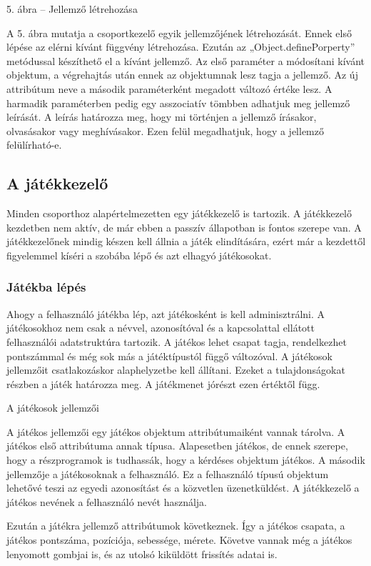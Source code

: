 \documentclass[bibliography=totocnumbered]{article}
\begin{document}
5. ábra -- Jellemző létrehozása

A 5. ábra mutatja a csoportkezelő egyik jellemzőjének létrehozását.
Ennek első lépése az elérni kívánt függvény létrehozása. Ezután az
„Object.definePorperty'' metódussal készíthető el a kívánt jellemző. Az
első paraméter a módosítani kívánt objektum, a végrehajtás után ennek az
objektumnak lesz tagja a jellemző. Az új attribútum neve a második
paraméterként megadott változó értéke lesz. A harmadik paraméterben
pedig egy asszociatív tömbben adhatjuk meg jellemző leírását. A leírás
határozza meg, hogy mi történjen a jellemző írásakor, olvasásakor vagy
meghívásakor. Ezen felül megadhatjuk, hogy a jellemző felülírható-e.


\subsection{A játékkezelő}

Minden csoporthoz alapértelmezetten egy játékkezelő is tartozik. A
játékkezelő kezdetben nem aktív, de már ebben a passzív állapotban is
fontos szerepe van. A játékkezelőnek mindig készen kell állnia a játék
elindítására, ezért már a kezdettől figyelemmel kíséri a szobába lépő és
azt elhagyó játékosokat.


\subsubsection{Játékba lépés}

Ahogy a felhasználó játékba lép, azt játékosként is kell adminisztrálni.
A játékosokhoz nem csak a névvel, azonosítóval és a kapcsolattal
ellátott felhasználói adatstruktúra tartozik. A játékos lehet csapat
tagja, rendelkezhet pontszámmal és még sok más a játéktípustól függő
változóval. A játékosok jellemzőit csatlakozáskor alaphelyzetbe kell
állítani. Ezeket a tulajdonságokat részben a játék határozza meg. A
játékmenet jórészt ezen értéktől függ.

A játékosok jellemzői

A játékos jellemzői egy játékos objektum attribútumaiként vannak
tárolva. A játékos első attribútuma annak típusa. Alapesetben játékos,
de ennek szerepe, hogy a részprogramok is tudhassák, hogy a kérdéses
objektum játékos. A második jellemzője a játékosoknak a felhasználó. Ez
a felhasználó típusú objektum lehetővé teszi az egyedi azonosítást és a
közvetlen üzenetküldést. A játékkezelő a játékos nevének a felhasználó
nevét használja.

Ezután a játékra jellemző attribútumok következnek. Így a játékos
csapata, a játékos pontszáma, pozíciója, sebessége, mérete. Követve
vannak még a játékos lenyomott gombjai is, és az utolsó kiküldött
frissítés adatai is.
\end{document}
